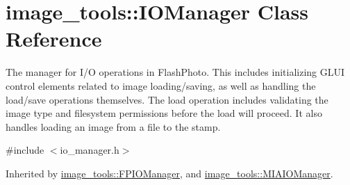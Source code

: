 \hypertarget{classimage__tools_1_1IOManager}{}\section{image\+\_\+tools\+:\+:I\+O\+Manager Class Reference}
\label{classimage__tools_1_1IOManager}


The manager for I/O operations in Flash\+Photo. This includes initializing G\+L\+UI control elements related to image loading/saving, as well as handling the load/save operations themselves. The load operation includes validating the image type and filesystem permissions before the load will proceed. It also handles loading an image from a file to the stamp.  




{\ttfamily \#include $<$io\+\_\+manager.\+h$>$}



Inherited by \hyperlink{classimage__tools_1_1FPIOManager}{image\+\_\+tools\+::\+F\+P\+I\+O\+Manager}, and \hyperlink{classimage__tools_1_1MIAIOManager}{image\+\_\+tools\+::\+M\+I\+A\+I\+O\+Manager}.

